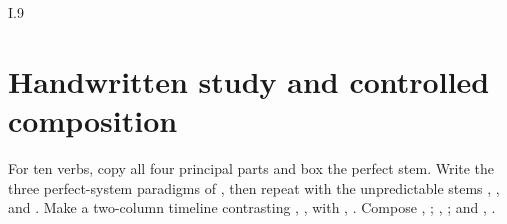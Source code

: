 \begin{courseunit}{I.9}
\section{Handwritten study and controlled composition}

For ten verbs, copy all four principal parts and box the perfect stem. Write
the three perfect-system paradigms of , then repeat with the
unpredictable stems , , and . Make a
two-column timeline contrasting , ,
with , . Compose , ; ,
; and ,
.



\end{courseunit}

